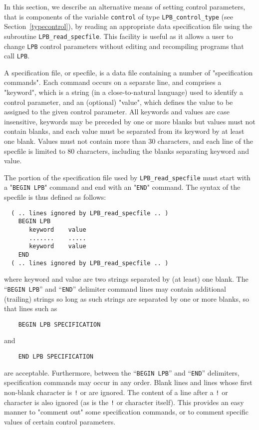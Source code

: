 \documentclass{galahad}
\newcommand{\packagename}{LPB}
\begin{document}

\galfeatures
\noindent In this section, we describe an alternative means of setting
control parameters, that is components of the variable {\tt control} of type
{\tt \packagename\_control\_type}
(see Section~\ref{typecontrol}),
by reading an appropriate data specification file using the
subroutine {\tt \packagename\_read\_specfile}. This facility
is useful as it allows a user to change  {\tt \packagename} control parameters
without editing and recompiling programs that call {\tt \packagename}.

A specification file, or specfile, is a data file containing a number of
"specification commands". Each command occurs on a separate line,
and comprises a "keyword",
which is a string (in a close-to-natural language) used to identify a
control parameter, and
an (optional) "value", which defines the value to be assigned to the given
control parameter. All keywords and values are case insensitive,
keywords may be preceded by one or more blanks but
values must not contain blanks, and
each value must be separated from its keyword by at least one blank.
Values must not contain more than 30 characters, and
each line of the specfile is limited to 80 characters,
including the blanks separating keyword and value.



The portion of the specification file used by
{\tt \packagename\_read\_specfile}
must start
with a "{\tt BEGIN \packagename}" command and end with an
"{\tt END}" command.  The syntax of the specfile is thus defined as follows:
\begin{verbatim}
  ( .. lines ignored by LPB_read_specfile .. )
    BEGIN LPB
       keyword    value
       .......    .....
       keyword    value
    END
  ( .. lines ignored by LPB_read_specfile .. )
\end{verbatim}
where keyword and value are two strings separated by (at least) one blank.
The ``{\tt BEGIN \packagename}'' and ``{\tt END}'' delimiter command lines
may contain additional (trailing) strings so long as such strings are
separated by one or more blanks, so that lines such as
\begin{verbatim}
    BEGIN LPB SPECIFICATION
\end{verbatim}
and
\begin{verbatim}
    END LPB SPECIFICATION
\end{verbatim}
are acceptable. Furthermore,
between the
``{\tt BEGIN \packagename}'' and ``{\tt END}'' delimiters,
specification commands may occur in any order.  Blank lines and
lines whose first non-blank character is {\tt !} or {\tt *} are ignored.
The content
of a line after a {\tt !} or {\tt *} character is also
ignored (as is the {\tt !} or {\tt *}
character itself). This provides an easy manner to "comment out" some
specification commands, or to comment specific values
of certain control parameters.
\end{document}
